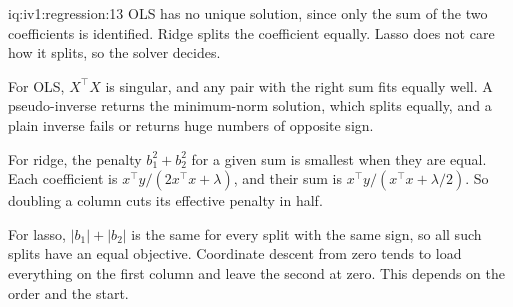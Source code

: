 \begin{solution}{iq:iv1:regression:13}
OLS has no unique solution, since only the sum of the two coefficients is identified. Ridge splits the coefficient equally. Lasso does not care how it splits, so the solver decides.

For OLS, $X^\top X$ is singular, and any pair with the right sum fits equally well. A pseudo-inverse returns the minimum-norm solution, which splits equally, and a plain inverse fails or returns huge numbers of opposite sign.

For ridge, the penalty $b_1^2 + b_2^2$ for a given sum is smallest when they are equal. Each coefficient is $x^\top y/(2x^\top x + \lambda)$, and their sum is $x^\top y/(x^\top x + \lambda/2)$. So doubling a column cuts its effective penalty in half.

For lasso, $|b_1| + |b_2|$ is the same for every split with the same sign, so all such splits have an equal objective. Coordinate descent from zero tends to load everything on the first column and leave the second at zero. This depends on the order and the start.

\end{solution}

